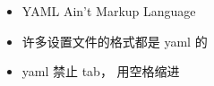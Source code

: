 
\begin{issues}
\issueDraft
\end{issues}

\begin{itemize}
\item YAML Ain't Markup Language
\item 许多设置文件的格式都是 yaml 的
\item yaml 禁止 tab， 用空格缩进
\end{itemize}
